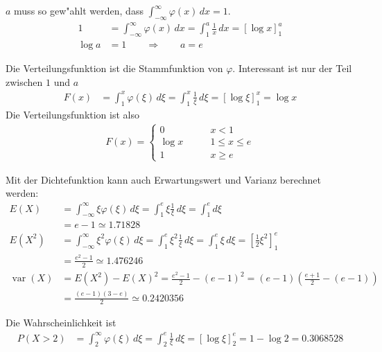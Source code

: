 \begin{loesung}
\begin{teilaufgaben}
\item
$a$ muss so gew"ahlt werden, dass
$\int_{-\infty}^\infty  \varphi(x)\,dx=1$.
\begin{align*}
1&=
\int_{-\infty}^{\infty}\varphi(x)\,dx
=
\int_1^a \frac1x\,dx
=
\left[
\log x
\right]_1^a
\\
\log a&=1\qquad \Rightarrow \qquad a=e
\end{align*}
\item
Die Verteilungsfunktion ist die Stammfunktion von $\varphi$. Interessant ist
nur der Teil zwischen $1$ und $a$
\begin{align*}
F(x)&=\int_1^x \varphi(\xi)\,d\xi=\int_1^x\frac1{\xi}\,d\xi=\left[\log\xi\right]_1^x=\log x
\end{align*}
Die Verteilungsfunktion ist also
\begin{align*}
F(x)=\begin{cases}
0&\qquad x < 1\\
\log x&\qquad 1\le x\le e\\
1&\qquad x \ge e
\end{cases}
\end{align*}
\item
Mit der Dichtefunktion kann auch Erwartungswert und Varianz berechnet werden:
\begin{align*}
E(X)
&=
\int_{-\infty}^\infty \xi\varphi(\xi)\,d\xi
=
\int_1^e\xi\frac1\xi\,d\xi
=
\int_1^ed\xi\\
&=e-1\simeq 1.71828
\\
E(X^2)
&=
\int_{-\infty}^\infty \xi^2\varphi(\xi)\,d\xi
=
\int_1^e\xi^2\frac1\xi\,d\xi
=
\int_1^e\xi\,d\xi=\left[\frac12\xi^2\right]_1^e\\
&=\frac{e^2 -1}2
\simeq 1.476246
\\
\operatorname{var}(X)
&=
E(X^2)-E(X)^2=\frac{e^2-1}2-(e-1)^2
=
(e-1)\left(
\frac{e+1}2-(e-1)
\right)
\\
&=
\frac{(e-1)(3-e)}2
\simeq
0.2420356
\end{align*}
\item
Die Wahrscheinlichkeit ist
\begin{align*}
P(X>2)
&=
\int_2^\infty\varphi(\xi)\,d\xi =\int_2^e\frac1\xi\,d\xi=\left[\log\xi\right]_2^e
=1-\log 2=0.3068528
\end{align*}
\end{teilaufgaben}
\end{loesung}


